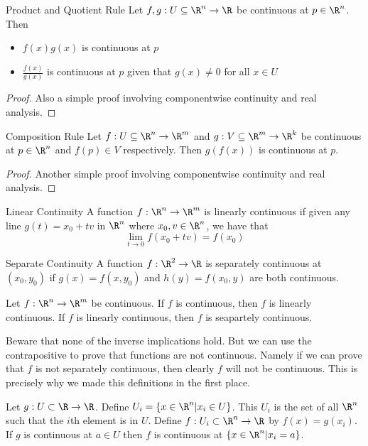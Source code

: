 \documentclass[a4paper]{article}
\begin{document}
\begin{prp}{Product and Quotient Rule}{} Let $f,g:U\subseteq\R^n\to\R$ be continuous at $p\in\R^n$. Then 
\begin{itemize}
\item $f(x)g(x)$ is continuous at $p$
\item $\frac{f(x)}{g(x)}$ is continuous at $p$ given that $g(x)\neq 0$ for all $x\in U$
\end{itemize} \tcbline
\begin{proof}
Also a simple proof involving componentwise continuity and real analysis. 
\end{proof}
\end{prp}

\begin{prp}{Composition Rule}{} Let $f:U\subseteq\R^n\to\R^m$ and $g:V\subseteq\R^m\to\R^k$ be continuous at $p\in\R^n$ and $f(p)\in V$ respectively. Then $g(f(x))$ is continuous at $p$. \tcbline
\begin{proof}
Another simple proof involving componentwise continuity and real analysis. 
\end{proof}
\end{prp}

\begin{defn}{Linear Continuity}{} A function $f:\R^n\to\R^m$ is linearly continuous if given any line $g(t)=x_0+tv$ in $\R^n$ where $x_0,v\in\R^n$, we have that $$\lim_{t\to 0}f(x_0+tv)=f(x_0)$$
\end{defn}

\begin{defn}{Separate Continuity}{} A function $f:\R^2\to\R$ is separately continuous at $(x_0,y_0)$ if $g(x)=f(x,y_0)$ and $h(y)=f(x_0,y)$ are both continuous. 
\end{defn}

\begin{prp}{}{} Let $f:\R^n\to\R^m$ be continuous. If $f$ is continuous, then $f$ is linearly continuous. If $f$ is linearly continuous, then $f$ is seapartely continuous. 
\end{prp}

Beware that none of the inverse implications hold. But we can use the contrapositive to prove that functions are not continuous. Namely if we can prove that $f$ is not separately continuous, then clearly $f$ will not be continuous. This is precisely why we made this definitions in the first place. 

\begin{prp}{}{} Let $g:U\subset\R\to\R$. Define $U_i=\{x\in\R^n|x_i\in U\}$. This $U_i$ is the set of all $\R^n$ such that the $i$th element is in $U$. Define $f:U_i\subset\R^n\to\R$ by $f(x)=g(x_i)$. If $g$ is continuous at $a\in U$ then $f$ is continuous at $\{x\in\R^n|x_i=a\}$. 
\end{prp}
\end{document}
